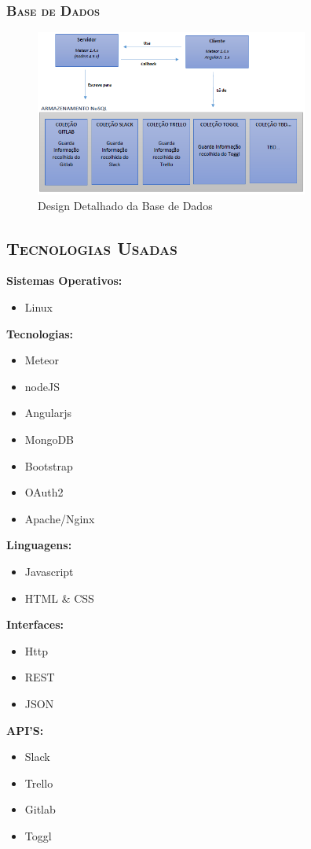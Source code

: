 \documentclass[12pt]{article}
\begin{document}
\vspace{5mm}

\subsubsection{ \textsc{Base de Dados}}
\begin{figure}[h!]
	\centering \includegraphics[width=9cm]{public/Architecture and Design of Software_5.png}
	\caption{Design Detalhado da Base de Dados}
\end{figure}


\pagebreak

\subsection{ \textsc{Tecnologias Usadas}}

\textbf{Sistemas Operativos:}
\begin{itemize}
\item Linux
\end{itemize}
\hfill \linebreak

\textbf{Tecnologias:}
\begin{itemize}
\item Meteor
\item nodeJS
\item Angularjs
\item MongoDB
\item Bootstrap
\item OAuth2
\item Apache/Nginx
\end{itemize}
\hfill \linebreak

\textbf{Linguagens:}
\begin{itemize}
\item Javascript
\item HTML \& CSS
\end{itemize}
\hfill \linebreak

\textbf{Interfaces:}
\begin{itemize}
\item Http
\item REST
\item JSON
\end{itemize}
\hfill \linebreak

\textbf{API’S:}
\begin{itemize}
\item Slack
\item Trello
\item Gitlab
\item Toggl
\end{itemize}
\hfill \linebreak

\pagebreak
\end{document}
